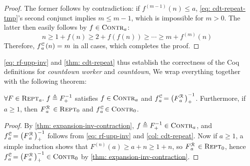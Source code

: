 \begin{proof}
	The former follows by contradiction: if $f^{(m-1)}(n) \le a$, \eqref{eq: cdt-repeat-tmp}'s second conjunct implies $m\le m-1$, which is impossible for $m > 0$. The latter then easily follows by $f\in \text{\scshape{Contr}}_{a}$:
	\begin{equation*}
	n \ge 1 + f(n) \ge 2 + f(f(n)) \ge \cdots \ge m + f^{(m)}(n)
	\end{equation*}
	Therefore, $\cdt{f}{a}(n) = m$ in all cases, which completes the proof.
\end{proof}
\cref{eq: rf-upp-inv} and \cref{thm: cdt-repeat} thus establish the correctness of the Coq definitions for \emph{countdown worker} and \emph{countdown},  We wrap everything together with the following theorem:
\begin{thm} \label{thm: cdt-inv-rf}
	$\forall F\in \text{\scshape{Rept}}_a.~f\triangleq F^{-1}_+$ satisfies $f \in \text{\scshape{Contr}}_{a}$ and $\displaystyle \cdt{f}{a} \ = \left(\rf{F}{a}\ \right)^{-1}_+$. Furthermore, if $a\ge 1$, then $\rf{F}{a}\ \in \repeatable_0$ and $\cdt{f}{a}\ \in \contract_0$.
\end{thm}
\begin{proof}
	By \cref{thm: expansion-inv-contraction}, $f\triangleq F^{-1}_+ \in \text{\scshape{Contr}}_a$, and $\cdt{f}{a}\ = \left(\rf{F}{a}\ \right)^{-1}_+$ follows from \eqref{eq: rf-upp-inv} and \cref{col: cdt-repeat}.
	Now if $a\ge 1$, a simple induction shows that $F^{(n)}(a)\ge a + n\ge 1 + n$, so $\rf{F}{a}\ \in \repeatable_0$, hence $\cdt{f}{a} \ = \left(\rf{F}{a}\ \right)^{-1}_+ \in \contract_0$ by \cref{thm: expansion-inv-contraction}.
\end{proof}

